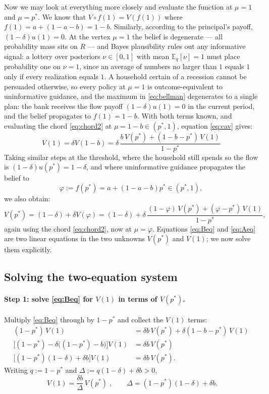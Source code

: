\documentclass[12pt]{article}
\begin{document}
Now we may look at everything more closely and evaluate the function at $\mu=1$ and $\mu=p^*$. We know that $V\circ f(1) = V(f(1))$ where $f(1) = a+(1-a-b) = 1-b$. Similarly, according to the principal's payoff, $(1-\delta)u(1) = 0$. At the vertex $\mu=1$ the belief is degenerate --- all probability mass sits on $R$ --- and Bayes plausibility rules out any informative signal: a lottery over posteriors $\nu\in[0,1]$ with mean $\mathbb{E}_q[\nu]=1$ must place probability one on $\nu=1$, since an average of numbers no larger than $1$ equals $1$ only if every realization equals $1$. A household certain of a recession cannot be persuaded otherwise, so every policy at $\mu=1$ is outcome-equivalent to uninformative guidance, and the maximum in \eqref{eq:bellman} degenerates to a single plan: the bank receives the flow payoff $(1-\delta)u(1)=0$ in the current period, and the belief propagates to $f(1)=1-b$. With both terms known, and evaluating the chord \eqref{eq:chord2} at $\mu = 1-b \in (p^*,1)$, equation \eqref{eq:cav} gives:
\begin{equation}\label{eq:Beq}
V(1) = \delta V(1-b) = \delta\,\frac{b\,V(p^*) + (1-b-p^*)\,V(1)}{1-p^*}
\end{equation}
Taking similar steps at the threshold, where the household still spends so the flow is $(1-\delta)u(p^*) = 1-\delta$, and where uninformative guidance propagates the belief to
\[
\varphi := f(p^*) = a + (1-a-b)p^* \in (p^*, 1),
\]
we also obtain:
\begin{equation}\label{eq:Aeq}
V(p^*) = (1-\delta) + \delta V(\varphi)
= (1-\delta) + \delta\,\frac{(1-\varphi)\,V(p^*) + (\varphi-p^*)\,V(1)}{1-p^*},
\end{equation}
again using the chord \eqref{eq:chord2}, now at $\mu = \varphi$. Equations \eqref{eq:Beq} and \eqref{eq:Aeq} are two linear equations in the two unknowns $V(p^*)$ and $V(1)$; we now solve them explicitly.

\subsection{Solving the two-equation system}\label{Solving}

\paragraph{Step 1: solve \eqref{eq:Beq} for $V(1)$ in terms of $V(p^*)$.}
Multiply \eqref{eq:Beq} through by $1-p^*$ and collect the $V(1)$ terms:
\begin{align*}
(1-p^*)\,V(1) &= \delta b\,V(p^*) + \delta(1-b-p^*)\,V(1)\\
\big[(1-p^*) - \delta\big((1-p^*)-b\big)\big]V(1) &= \delta b\,V(p^*)\\
\big[(1-p^*)(1-\delta) + \delta b\big]V(1) &= \delta b\,V(p^*).
\end{align*}
Writing $q := 1-p^*$ and $\Delta := q(1-\delta) + \delta b > 0$,
\begin{equation}\label{eq:V1}
\boxed{\;V(1) = \frac{\delta b}{\Delta}\,V(p^*)\;},
\qquad \Delta = (1-p^*)(1-\delta) + \delta b .
\end{equation}
\end{document}
